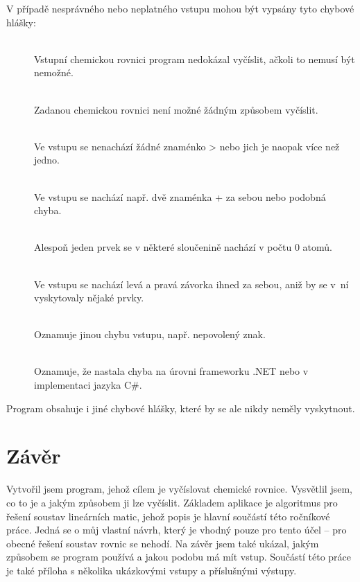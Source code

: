 \documentclass[12pt,a4paper]{report}
\begin{document}
V případě nesprávného nebo neplatného vstupu mohou být vypsány tyto chybové hlášky:
\begin{description}
	\item[]~\\
	Vstupní chemickou rovnici program nedokázal vyčíslit, ačkoli to nemusí být nemožné.
	
	\item[]~\\
	Zadanou chemickou rovnici není možné žádným způsobem vyčíslit.
	
	\item[]~\\
	Ve vstupu se nenachází žádné znaménko > nebo jich je naopak více než jedno.
	
	
	\item[]~\\
	Ve vstupu se nachází např. dvě znaménka + za sebou nebo podobná chyba.
	
	\item[]~\\
	Alespoň jeden prvek se v některé sloučenině nachází v počtu 0 atomů.
	
	\item[]~\\
	Ve vstupu se nachází levá a pravá závorka ihned za sebou, aniž by se v~ní vyskytovaly nějaké prvky.
	
	\item[]~\\
	Oznamuje jinou chybu vstupu, např. nepovolený znak.
	
	\item[]~\\
	Oznamuje, že nastala chyba na úrovni frameworku .NET nebo v implementaci jazyka C\#.
\end{description} 
Program obsahuje i jiné chybové hlášky, které by se ale nikdy neměly vyskytnout.

\chapter{Závěr}
Vytvořil jsem program, jehož cílem je vyčíslovat chemické rovnice. Vysvětlil jsem, co to je a jakým způsobem ji lze vyčíslit. Základem aplikace je algoritmus pro řešení soustav lineárních matic, jehož popis je hlavní součástí této ročníkové práce. Jedná se o můj vlastní návrh, který je vhodný pouze pro tento účel -- pro obecné řešení soustav rovnic se nehodí. Na závěr jsem také ukázal, jakým způsobem se program používá a jakou podobu má mít vstup. Součástí této práce je také příloha s několika ukázkovými vstupy a příslušnými výstupy.
\end{document}
